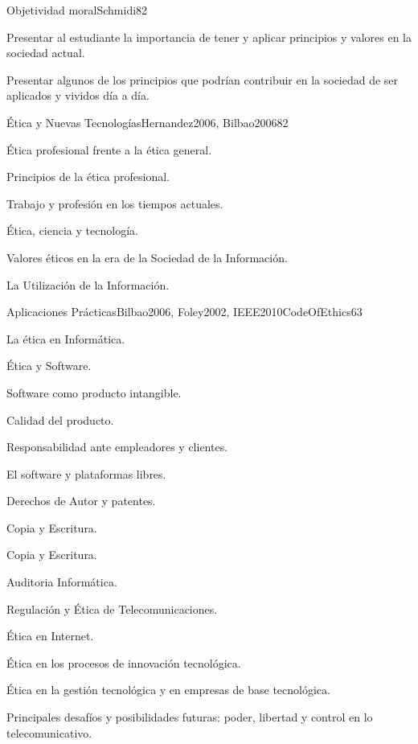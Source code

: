 \begin{syllabus}
\begin{unit}{Objetividad moral}{Schmidi}{8}{2}
\begin{unitgoals}
	\item Presentar al estudiante la importancia de tener y aplicar principios y valores en la sociedad actual.
	\item Presentar algunos de los principios que podrían contribuir en la sociedad de ser aplicados y vividos día a día.
\end{unitgoals}
\end{unit}

\begin{unit}{Ética y Nuevas Tecnologías}{Hernandez2006, Bilbao2006}{8}{2}
\begin{topics}
      \item Ética profesional frente a la ética general.
      \item Principios de la ética profesional.
      \item Trabajo y profesión en los tiempos actuales.
      \item Ética, ciencia y tecnología.
      \item Valores éticos en la era de la Sociedad de la Información.
      \item La Utilización de la Información.
\end{topics}
\end{unit}

\begin{unit}{Aplicaciones Prácticas}{Bilbao2006, Foley2002, IEEE2010CodeOfEthics}{6}{3}
\begin{topics}
      \item La ética en Informática.
      \item Ética y Software.
      \item Software como producto intangible.
      \item Calidad del producto.
      \item Responsabilidad ante empleadores y clientes.
      \item El software y plataformas libres.
      \item Derechos de Autor y patentes.
      \item Copia y Escritura.
      \item Copia y Escritura.
      \item Auditoria Informática.
      \item Regulación y Ética de Telecomunicaciones.
      \item Ética en Internet.
      \item Ética en los procesos de innovación tecnológica.
      \item Ética en la gestión tecnológica y en empresas de base tecnológica.
      \item Principales desafíos y posibilidades futuras: poder, libertad y control en lo telecomunicativo.
\end{topics}
\end{unit}



\begin{coursebibliography}
\end{coursebibliography}

\end{syllabus}
